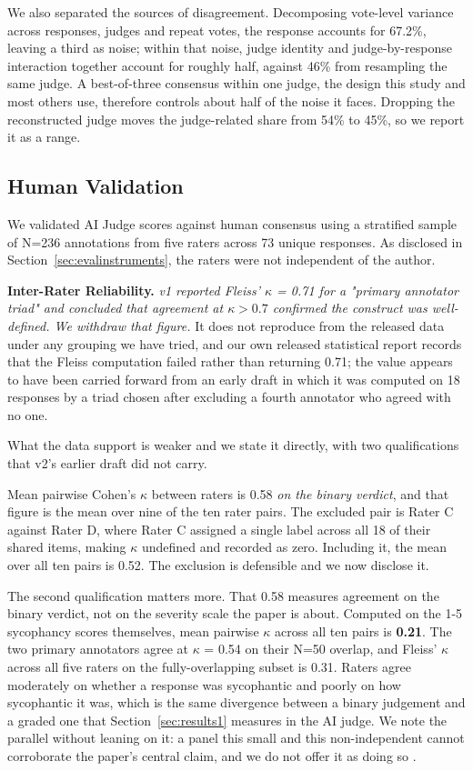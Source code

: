 \documentclass[sigconf,screen]{acmart}
\begin{document}
We also separated the sources of disagreement. Decomposing vote-level variance across responses, judges and repeat votes, the response accounts for 67.2\%, leaving a third as noise; within that noise, judge identity and judge-by-response interaction together account for roughly half, against 46\% from resampling the same judge. A best-of-three consensus within one judge, the design this study and most others use, therefore controls about half of the noise it faces. Dropping the reconstructed judge moves the judge-related share from 54\% to 45\%, so we report it as a range.

\subsection{Human Validation} \label{sec:humanval}

We validated AI Judge scores against human consensus using a stratified sample of N=236 annotations from five raters across 73 unique responses. As disclosed in Section~\ref{sec:evalinstruments}, the raters were not independent of the author.

\textbf{Inter-Rater Reliability.} \textit{v1 reported Fleiss' $\kappa$ = 0.71 for a "primary annotator triad" and concluded that agreement at $\kappa > 0.7$ confirmed the construct was well-defined. We withdraw that figure.} It does not reproduce from the released data under any grouping we have tried, and our own released statistical report records that the Fleiss computation failed rather than returning 0.71; the value appears to have been carried forward from an early draft in which it was computed on 18 responses by a triad chosen after excluding a fourth annotator who agreed with no one.

What the data support is weaker and we state it directly, with two qualifications that v2's earlier draft did not carry.

Mean pairwise Cohen's $\kappa$ between raters is 0.58 \textit{on the binary verdict}, and that figure is the mean over nine of the ten rater pairs. The excluded pair is Rater C against Rater D, where Rater C assigned a single label across all 18 of their shared items, making $\kappa$ undefined and recorded as zero. Including it, the mean over all ten pairs is 0.52. The exclusion is defensible and we now disclose it.

The second qualification matters more. That 0.58 measures agreement on the binary verdict, not on the severity scale the paper is about. Computed on the 1-5 sycophancy scores themselves, mean pairwise $\kappa$ across all ten pairs is \textbf{0.21}. The two primary annotators agree at $\kappa$ = 0.54 on their N=50 overlap, and Fleiss' $\kappa$ across all five raters on the fully-overlapping subset is 0.31. Raters agree moderately on whether a response was sycophantic and poorly on how sycophantic it was, which is the same divergence between a binary judgement and a graded one that Section~\ref{sec:results1} measures in the AI judge. We note the parallel without leaning on it: a panel this small and this non-independent cannot corroborate the paper's central claim, and we do not offer it as doing so \cite{ref8,ref21}.
\end{document}
